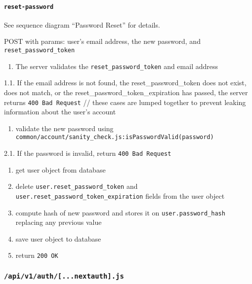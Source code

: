 \hypertarget{reset-password}{%
\paragraph{\texorpdfstring{\texttt{reset-password}}{reset-password}}\label{reset-password}}

See sequence diagram ``Password Reset'' for details.

POST with params: user's email address, the new password, and
\texttt{reset\_password\_token}

\begin{enumerate}
\def\labelenumi{\arabic{enumi}.}
\tightlist
\item
  The server validates the \texttt{reset\_password\_token} and email
  address
\end{enumerate}

1.1. If the email address is not found, the reset\_password\_token does
not exist, does not match, or the reset\_password\_token\_expiration has
passed, the server returns \texttt{400\ Bad\ Request} // these cases are
lumped together to prevent leaking information about the user's account

\begin{enumerate}
\def\labelenumi{\arabic{enumi}.}
\setcounter{enumi}{1}
\tightlist
\item
  validate the new password using
  \texttt{common/account/sanity\_check.js:isPasswordValid(password)}
\end{enumerate}

2.1. If the password is invalid, return \texttt{400\ Bad\ Request}

\begin{enumerate}
\def\labelenumi{\arabic{enumi}.}
\setcounter{enumi}{2}
\item
  get user object from database
\item
  delete \texttt{user.reset\_password\_token} and
  \texttt{user.reset\_password\_token\_expiration} fields from the user
  object
\item
  compute hash of new password and stores it on
  \texttt{user.password\_hash} replacing any previous value
\item
  save user object to database
\item
  return \texttt{200\ OK}
\end{enumerate}

\hypertarget{apiv1auth...nextauth.js}{%
\subsubsection{\texorpdfstring{\texttt{/api/v1/auth/{[}...nextauth{]}.js}}{/api/v1/auth/{[}...nextauth{]}.js}}\label{apiv1auth...nextauth.js}}

